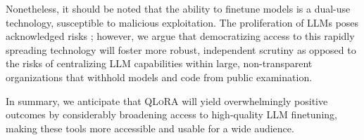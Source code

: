 Nonetheless, it should be noted that the ability to finetune models is a dual-use technology, susceptible to malicious exploitation. The proliferation of LLMs poses acknowledged risks \citep{bommasani2021opportunities,bender2021dangers}; however, we argue that democratizing access to this rapidly spreading technology will foster more robust, independent scrutiny as opposed to the risks of centralizing LLM capabilities within large, non-transparent organizations that withhold models and code from public examination.

In summary, we anticipate that \textsc{QLoRA} will yield overwhelmingly positive outcomes by considerably broadening access to high-quality LLM finetuning, making these tools more accessible and usable for a wide audience.